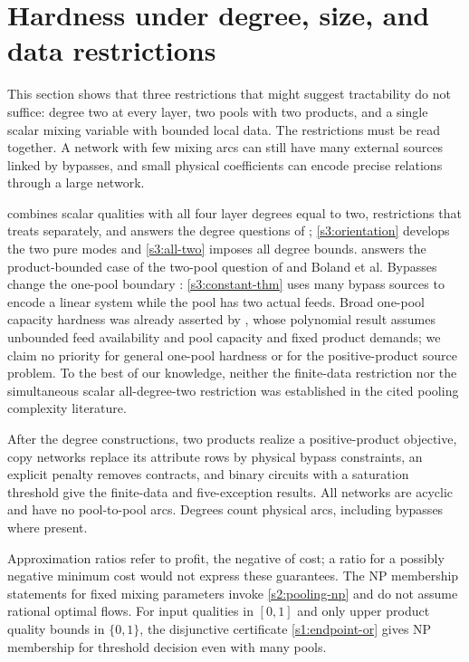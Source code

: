 \section{Hardness under degree, size, and data restrictions}\label{s3:hardness}

This section shows that three restrictions that might suggest
tractability do not suffice: degree two at every layer, two pools with
two products, and a single scalar mixing variable with bounded local
data. The restrictions must be read together. A network with few mixing
arcs can still have many external sources linked by bypasses, and small
physical coefficients can encode precise relations through a large
network.

 combines scalar qualities with all four layer
degrees equal to two, restrictions that
\citet[Sections~4--6]{haugland2016-the-computational-complexity-of-the}
treats separately, and answers the degree questions of
\citet[author manuscript, Section~4, p.~8]{s4:boland2017};
\cref{s3:orientation} develops the two pure modes and \cref{s3:all-two}
imposes all degree bounds.  answers the
product-bounded case of the two-pool question of
\citet[Section~6, p.~214]{haugland2016-the-computational-complexity-of-the}
and Boland et al. Bypasses change the one-pool boundary
\citep[Section~4.5, p.~607]{s3:haugland-hendrix2016}:
\cref{s3:constant-thm} uses many bypass sources to encode a linear
system while the pool has two actual feeds. Broad one-pool capacity
hardness was already asserted by \citet[Remark~4.6]{s3:baltean2018},
whose polynomial result assumes unbounded feed availability and pool
capacity and fixed product demands; we claim no priority for general
one-pool hardness or for the positive-product source problem. To the
best of our knowledge, neither the finite-data restriction nor the
simultaneous scalar all-degree-two restriction was established in the
cited pooling complexity literature.

After the degree constructions, two products realize a positive-product
objective, copy networks replace its attribute rows by physical bypass
constraints, an explicit penalty removes contracts, and binary circuits
with a saturation threshold give the finite-data and five-exception
results.
All networks are acyclic and have no pool-to-pool arcs. Degrees count
physical arcs, including bypasses where present.

Approximation ratios refer to profit, the negative of cost; a ratio for
a possibly negative minimum cost would not express these guarantees.
The NP membership statements for fixed mixing parameters invoke
\cref{s2:pooling-np} and do not assume rational optimal flows. For
input qualities in $[0,1]$ and only upper product quality bounds in
$\{0,1\}$, the disjunctive certificate \eqref{s1:endpoint-or} gives
NP membership for threshold decision even with many pools.

